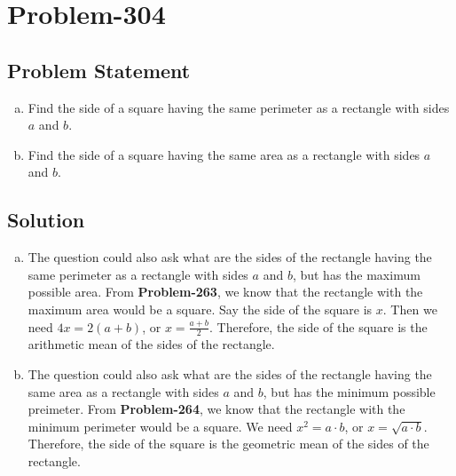 \documentclass{article}
\begin{document}
\section*{Problem-304}
\subsection*{Problem Statement}
\begin{enumerate}[(a)]
	\item Find the side of a square having the same perimeter as a rectangle with sides $a$ and $b$.
	\item Find the side of a square having the same area as a rectangle with sides $a$ and $b$.
\end{enumerate}

\subsection*{Solution}
\begin{enumerate}[(a)]
	\item The question could also ask what are the sides of the rectangle having the same perimeter as a rectangle with sides $a$ and $b$, but has the maximum possible area. From \textbf{Problem-263}, we know that the rectangle with the maximum area would be a square.  Say the side of the square is $x$. Then we need $4x = 2(a+b)$, or $x = \frac{a+b}{2}$. Therefore, the side of the square is the arithmetic mean of the sides of the rectangle.
	\item The question could also ask what are the sides of the rectangle having the same area as a rectangle with sides $a$ and $b$, but has the minimum possible preimeter. From \textbf{Problem-264}, we know that the rectangle with the minimum perimeter would be a square. We need $x^2 = a \cdot b$, or $x = \sqrt{a \cdot b}$. Therefore, the side of the square is the geometric mean of the sides of the rectangle.
\end{enumerate}
\end{document}

